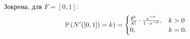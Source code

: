Зокрема, для $F = [0, 1]$:
\begin{gather}
    \P{N' ([0, 1]) = k} = 
    \begin{cases}
        \frac{\theta^k}{k!} \cdot \frac{e^{-\theta}}{1 - e^{-\theta}}, & k > 0 \\
        0, & k = 0.
    \end{cases}
\end{gather}

